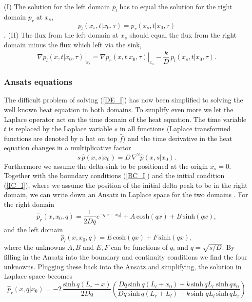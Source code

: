 (I) The solution for the left domain $p_l$ has to equal the solution for the right domain $p_r$ at $x_s$,
\begin{equation} 
 p_l(x_s,t|x_0,\tau) = p_r(x_s,t|x_0,\tau) 
\end{equation}.
(II) The flux from the left domain at $x_s$ should equal the flux from the right domain minus the flux which left via the sink,
\begin{equation} 
 \left. \nabla p_l(x,t|x_0,\tau) \right|_{x_s} = \left. \nabla p_r(x,t|x_0,\tau) \right|_{x_s} - \frac{k}{D} \, p_{l}(x_s,t|x_0,\tau).
\end{equation}

\subsubsection{Ansats equations}

The difficult problem of solving (\ref{DE_I}) has now been simplified to solving the well known heat equation in both domains. To simplify even more we let the Laplace operator act on the time domain of the heat equation. The time variable $t$ is replaced by the Laplace variable $s$ in all functions (Laplace transformed functions are denoted by a hat on top $\hat{f}$) and the time derivative in the heat equation changes in a multiplicative factor
\begin{equation}
 s \, \hat{p}(x,s|x_0) = D \, \nabla^2 \hat{p}(x,s|x_0).
\end{equation}
Furthermore we assume the delta-sink to be positioned at the origin $x_s=0$. Together with the boundary conditions (\ref{BC_I}) and the initial condition (\ref{IC_I}), where we assume the position of the initial delta peak to be in the right domain, we can write down an Ansatz in Laplace space for the two domains \cite{Carslaw1959}. For the right domain
\begin{equation}
 \hat{p}_r(x,x_0,q) = \frac{1}{2 D q} e^{-q |x-x_0|} + A \, \mathrm{cosh} (q x) + B \, \mathrm{sinh} (q x),
 \label{Anz_R}
\end{equation}
and the left domain
\begin{equation}
 \hat{p}_l(x,x_0,q) = E \, \mathrm{cosh} (q x) + F \, \mathrm{sinh} (q x),
\label{Anz_L}
\end{equation}
where the unknowns $A,B$ and $E,F$ can be functions of $q$, and $q=\sqrt{s/D}$. By filling in the Ansatz into the boundary and continuity conditions we find the four unknowns. Plugging these back into the Ansatz and simplifying, the solution in Laplace space becomes
\begin{equation}
 \hat{p}_r(x,q|x_0) = -2 \, \frac{\mathrm{sinh} \, q(L_r - x)}{2 D q} \left( \frac{Dq \, \mathrm{sinh} \, q(L_l + x_0) + k \, \mathrm{sinh} \, q L_l \,\, \mathrm{sinh} \, q x_0}{Dq \, \mathrm{sinh} \, q(L_r + L_l) + k \, \mathrm{sinh} \,\, q L_l \, \mathrm{sinh} \, q L_r} \right)
 \label{SOL_R}
\end{equation}

